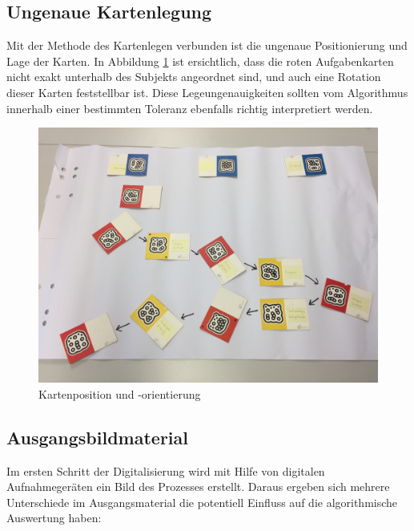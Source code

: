 \subsection{Ungenaue Kartenlegung} %
\label{ssub:ungenaue_kartenlegung}
Mit der Methode des Kartenlegen verbunden ist die ungenaue Positionierung und Lage der Karten. In Abbildung \ref{fig:karten-position} ist ersichtlich, dass die roten Aufgabenkarten nicht exakt unterhalb des Subjekts angeordnet sind, und auch eine Rotation dieser Karten feststellbar ist. Diese Legeungenauigkeiten sollten vom Algorithmus innerhalb einer bestimmten Toleranz ebenfalls richtig interpretiert werden.

\begin{figure}[h]
	\centering 
	\begin{minipage}[b]{0.8\textwidth} 
		\includegraphics[width=\textwidth]{figures/02.jpg}
		\caption[Kartenposition und -orientierung]{Kartenposition und -orientierung  \protect~\cite{max}}
		\label{fig:karten-position} 
	\end{minipage}
\end{figure}

\subsection{Ausgangsbildmaterial} %
\label{sub:ausgangsbildmaterial}
Im ersten Schritt der Digitalisierung wird mit Hilfe von digitalen Aufnahmegeräten ein Bild des Prozesses erstellt. Daraus ergeben sich mehrere Unterschiede im Ausgangsmaterial die potentiell Einfluss auf die algorithmische Auswertung haben:

